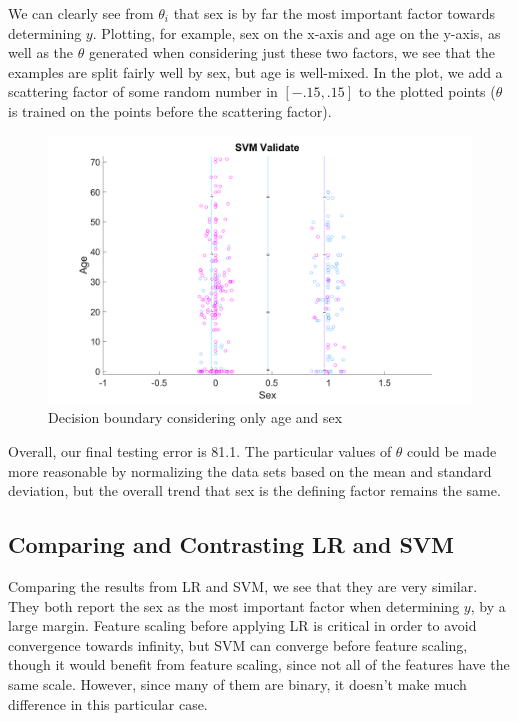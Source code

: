 \documentclass[10pt,letterpaper]{article}
\begin{document}
We can clearly see from $\theta_i$ that sex is by far the most important factor towards determining $y$. Plotting, for example, sex on the x-axis and age on the y-axis, as well as the $\theta$ generated when considering just these two factors, we see that the examples are split fairly well by sex, but age is well-mixed. In the plot, we add a scattering factor of some random number in $[-.15,.15]$ to the plotted points ($\theta$ is trained on the points before the scattering factor).

\begin{figure}[!htb]
\begin{center}
\includegraphics[width=.75\linewidth]{figures/sex_age_validate.png}
\caption{Decision boundary considering only age and sex}
\end{center}
\end{figure}

Overall, our final testing error is 81.1. The particular values of $\theta$ could be made more reasonable by normalizing the data sets based on the mean and standard deviation, but the overall trend that sex is the defining factor remains the same.

\subsection{Comparing and Contrasting LR and SVM}
Comparing the results from LR and SVM, we see that they are very similar. They both report the sex as the most important factor when determining $y$, by a large margin. Feature scaling before applying LR is critical in order to avoid convergence towards infinity, but SVM can converge before feature scaling, though it would benefit from feature scaling, since not all of the features have the same scale. However, since many of them are binary, it doesn't make much difference in this particular case.
\end{document}
